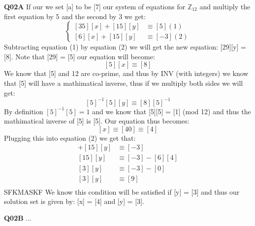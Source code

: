 \documentclass[11pt]{article}
\begin{document}
\parindent=0pt

\textbf{Q02A} If our we set [a] to be [7] our system of equations for $\mathbb Z_12$ and multiply the first equation by 5 and the second by 3 we get:
$$
\begin{cases}
[35][x] + [15][y] & \equiv [5]       (1)\\
[6][x] + [15][y] & \equiv [-3]      (2)
\end{cases}
$$
Subtracting equation (1) by equation (2) we will get the new equation: [29][y] = [8]. Note that [29] = [5] our equation will become:
\[ [5][x] \equiv [8] \]
We know that [5] and 12 are co-prime, and thus by INV (with integers) we know that [5] will have a mathimatical inverse, thus if we multiply both sides we will get:
\[ [5]^{-1}[5][y] \equiv [8][5]^{-1} \]
By definition $[5]^{-1}[5] = 1$ and we know that [5][5] = [1] (mod 12) and thus the mathimatical inverse of [5] is [5]. Our equation thus becomes:
\[ [x] \equiv [40] \equiv [4] \]
Plugging this into equation (2) we get that:
\begin{align*}
 [6][x] + [15][y] & \equiv [-3]  \\
 [15][y]  & \equiv [-3]  - [6][4] \\
 [3][y]  & \equiv [-3]  - [0] \\
 [3][y]  & \equiv [9]\\
\end{align*}
SFKMASKF
We know this condition will be satisfied if [y] = [3] and thus our solution set is given by: [x] = [4] and [y] = [3].


\textbf{Q02B} ...
\end{document}
